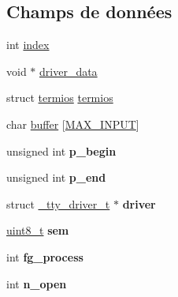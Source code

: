 \subsection*{\-Champs de données}
\begin{DoxyCompactItemize}
\item 
int \hyperlink{struct__tty__struct__t_a4208e736cfcd8e0b00a3c0bbfe4674f7}{index}
\item 
void $\ast$ \hyperlink{struct__tty__struct__t_a974cb784cad13e547e5cace553875f90}{driver\-\_\-data}
\item 
struct \hyperlink{structtermios}{termios} \hyperlink{struct__tty__struct__t_a39471b82fd4e3a235744e73775ac2523}{termios}
\item 
char \hyperlink{struct__tty__struct__t_ace735f0fca7a2e1c4c75f6ffb9223b19}{buffer} \mbox{[}\hyperlink{tty_8h_a00c1f0e7816626f58349492ef0720b5f}{\-M\-A\-X\-\_\-\-I\-N\-P\-U\-T}\mbox{]}
\item 
\hypertarget{struct__tty__struct__t_ae136497684ded03f21999f2239b3b67c}{unsigned int {\bfseries p\-\_\-begin}}\label{struct__tty__struct__t_ae136497684ded03f21999f2239b3b67c}

\item 
\hypertarget{struct__tty__struct__t_a437e8f9f913784a7f60cf95af3917b23}{unsigned int {\bfseries p\-\_\-end}}\label{struct__tty__struct__t_a437e8f9f913784a7f60cf95af3917b23}

\item 
\hypertarget{struct__tty__struct__t_a10847c2c12b0a9e131f107ec9dbe65f8}{struct \hyperlink{struct__tty__driver__t}{\-\_\-tty\-\_\-driver\-\_\-t} $\ast$ {\bfseries driver}}\label{struct__tty__struct__t_a10847c2c12b0a9e131f107ec9dbe65f8}

\item 
\hypertarget{struct__tty__struct__t_ac5522c658c4a0e142e85142432fa44fe}{\hyperlink{types_8h_aba7bc1797add20fe3efdf37ced1182c5}{uint8\-\_\-t} {\bfseries sem}}\label{struct__tty__struct__t_ac5522c658c4a0e142e85142432fa44fe}

\item 
\hypertarget{struct__tty__struct__t_ad017c8b00079444a966de0a0d31b1dd7}{int {\bfseries fg\-\_\-process}}\label{struct__tty__struct__t_ad017c8b00079444a966de0a0d31b1dd7}

\item 
\hypertarget{struct__tty__struct__t_a31c54deea3b926404682b196eb366966}{int {\bfseries n\-\_\-open}}\label{struct__tty__struct__t_a31c54deea3b926404682b196eb366966}

\end{DoxyCompactItemize}


